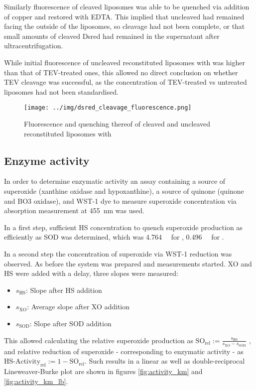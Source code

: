 Similarly fluorescence of cleaved liposomes was able to be quenched via
addition of copper and restored with EDTA. This implied that uncleaved
\hsdsred{} had remained facing the outside of the liposomes, so cleavage had
not been complete, or that small amounts of cleaved Dsred had remained in the
supernatant after ultracentrifugation.

While initial fluorescence of uncleaved reconstituted liposomes with \hsdsred{}
was higher than that of TEV-treated ones, this allowed no direct conclusion on
whether TEV cleavage was successful, as the concentration of TEV-treated vs
untreated liposomes had not been standardised.

\begin{figure}
	\centering
	\texttt{[image: ../img/dsred\_cleavage\_fluorescence.png]}
	\caption{Fluorescence and quenching thereof of cleaved and uncleaved reconstituted liposomes with \hsdsred{}}
	\label{fig:dsred_cleavage_fluorescence}
\end{figure}

\subsection{Enzyme activity}

In order to determine enzymatic activity an assay containing a source of
superoxide (xanthine oxidase and hypoxanthine), a source of quinone (quinone
and BO3 oxidase), and WST-1 dye to measure superoxide concentration via
absorption measurement at \SI{455}{\nm} was used.

In a first step, sufficient HS concentration to quench superoxide production as
efficiently as SOD was determined, which was \SI{4.764}{\micro\Molar} for 
\hsmut{}, \SI{0.496}{\micro\Molar} for \hs{}.

In a second step the concentration of superoxide via WST-1 reduction was
observed. As before the system was prepared and measurements started. XO and HS
were added with a delay, three slopes were measured:

\begin{itemize}
	\item $s_{\text{HS}}$: Slope after HS addition
	\item $s_{\text{XO}}$: Average slope after XO addition
	\item $s_{\text{SOD}}$: Slope after SOD addition
\end{itemize}

This allowed calculating the relative superoxide production as
$\text{SO}_{\text{rel}} := \frac{s_{\text{HS}}}{s_{\text{XO}} -
s_{\text{SOD}}}$ , and relative reduction of superoxide - corresponding to
enzymatic activity - as  $\text{HS-Activity}_{\text{rel}} := 1 -
\text{SO}_{\text{rel}}$. Such results in a linear as well as double-reciprocal
Lineweaver-Burke plot are shown in figures \ref{fig:activity_km} and
\ref{fig:activity_km_lb}.

